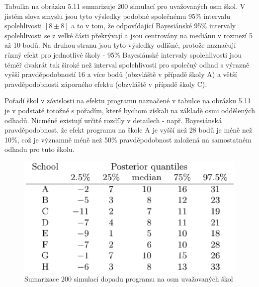 Tabulka na obrázku 5.11 sumarizuje 200 simulací pro uvažovaných osm škol. V jistém slova smyslu jsou tyto výsledky podobné společnému 95\% intervalu spolehlivosti $[8 \pm 8]$ a to v tom, že odpovídající Bayesiánské 95\% intervaly spolehlivosti se z velké části překrývají a jsou centrovány na mediánu v rozmezí 5 až 10 bodů. Na druhou stranu jsou tyto výsledky odlišné, protože naznačují různý efekt pro jednotlivé školy - 95\% Bayesiánské intervaly spolehlivosti jsou téměř dvakrát tak široké než interval spolehlivosti pro společný odhad s výrazně vyšší pravděpodobností 16 a více bodů (obzvláště v případě školy A) a větší pravděpodobnosti záporného efektu (obzvláště v případě školy C).

Pořadí škol v závislosti na efektu programu naznačené v tabulce na obrázku 5.11 je v podstatě totožné s pořadím, které bychom získali na základě osmi oddělených odhadů. Nicméně existují určité rozdíly v detailech - např. Bayesiánská pravděpodobnost, že efekt programu na škole A je vyšší než 28 bodů je méně než 10\%, což je významně méně než 50\% pravděpodobnost založená na samostatném odhadu pro tuto školu.
\begin{figure}[htp]
\centering
\includegraphics[scale = 0.45]{pictures/tbl_5_4.eps}
\caption{Sumarizace 200 simulací dopadu programu na osm uvažovaných škol}
\label{tbl_5_4}
\end{figure}

